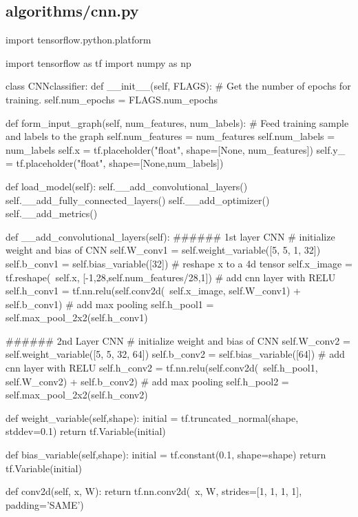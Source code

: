 \documentclass{article}
\begin{document}
\subsection*{algorithms/cnn.py}
\begin{python}
import tensorflow.python.platform

import tensorflow as tf
import numpy as np

class CNNclassifier:
    def __init__(self, FLAGS):
        # Get the number of epochs for training.
        self.num_epochs = FLAGS.num_epochs

    def form_input_graph(self, num_features, num_labels):
        # Feed training sample and labels to the graph
        self.num_features = num_features
        self.num_labels = num_labels
        self.x = tf.placeholder("float", shape=[None, num_features])
        self.y_ = tf.placeholder("float", shape=[None,num_labels])

    def load_model(self):
        self.__add_convolutional_layers()
        self.__add_fully_connected_layers()
        self.__add_optimizer()
        self.__add_metrics()


    def __add_convolutional_layers(self):
        ###### 1st layer CNN
        # initialize weight and bias of CNN
        self.W_conv1 = self.weight_variable([5, 5, 1, 32])
        self.b_conv1 = self.bias_variable([32])
        # reshape x to a 4d tensor
        self.x_image = tf.reshape(\
            self.x, [-1,28,self.num_features/28,1])
        # add cnn layer with RELU
        self.h_conv1 = tf.nn.relu(self.conv2d(\
            self.x_image, self.W_conv1) + self.b_conv1)
        # add max pooling
        self.h_pool1 = self.max_pool_2x2(self.h_conv1)

        ###### 2nd Layer CNN
        # initialize weight and bias of CNN
        self.W_conv2 = self.weight_variable([5, 5, 32, 64])
        self.b_conv2 = self.bias_variable([64])
        # add cnn layer with RELU
        self.h_conv2 = tf.nn.relu(self.conv2d(\
            self.h_pool1, self.W_conv2) + self.b_conv2)
        # add max pooling
        self.h_pool2 = self.max_pool_2x2(self.h_conv2)

    def weight_variable(self,shape):
      initial = tf.truncated_normal(shape, stddev=0.1)
      return tf.Variable(initial)

    def bias_variable(self,shape):
      initial = tf.constant(0.1, shape=shape)
      return tf.Variable(initial)

    def conv2d(self, x, W):
      return tf.nn.conv2d(\
        x, W, strides=[1, 1, 1, 1], padding='SAME')


\end{python}
\end{document}
